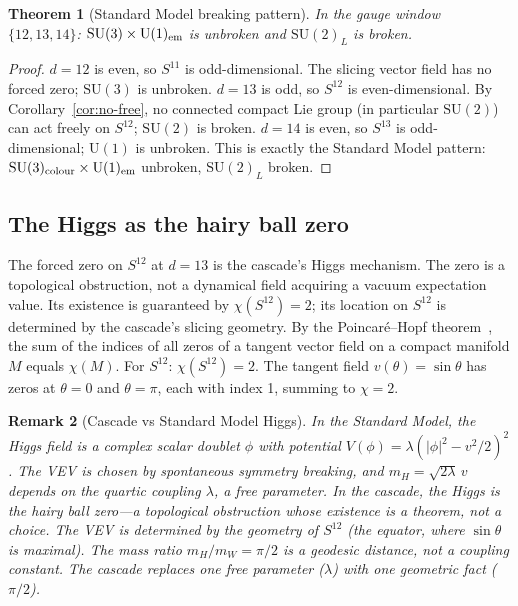 \documentclass[12pt,a4paper]{article}
\newtheorem{theorem}{Theorem}[section]
\newtheorem{remark}[theorem]{Remark}
\begin{document}
\begin{theorem}[Standard Model breaking pattern]\label{thm:breaking}
In the gauge window $\{12,13,14\}$: $\mathrm{SU}(3)\times\mathrm{U}(1)_{\rm em}$ is
unbroken and $\mathrm{SU}(2)_L$ is broken.
\end{theorem}
\begin{proof}
$d=12$ is even, so $S^{11}$ is odd-dimensional. The slicing vector field has no forced
zero; $\mathrm{SU}(3)$ is unbroken. $d=13$ is odd, so $S^{12}$ is even-dimensional.
By Corollary~\ref{cor:no-free}, no connected compact Lie group (in particular
$\mathrm{SU}(2)$) can act freely on $S^{12}$; $\mathrm{SU}(2)$ is broken. $d=14$ is
even, so $S^{13}$ is odd-dimensional; $\mathrm{U}(1)$ is unbroken. This is exactly the
Standard Model pattern: $\mathrm{SU}(3)_{\rm colour}\times\mathrm{U}(1)_{\rm em}$
unbroken, $\mathrm{SU}(2)_L$ broken.
\end{proof}

\subsection{The Higgs as the hairy ball zero}

The forced zero on $S^{12}$ at $d=13$ is the cascade's Higgs mechanism. The zero is a
topological obstruction, not a dynamical field acquiring a vacuum expectation value. Its
existence is guaranteed by $\chi(S^{12})=2$; its location on $S^{12}$ is determined by the
cascade's slicing geometry. By the Poincar\'{e}--Hopf theorem~\cite{hopf}, the sum of the
indices of all zeros of a tangent vector field on a compact manifold $M$ equals $\chi(M)$.
For $S^{12}$: $\chi(S^{12})=2$. The tangent field $v(\theta)=\sin\theta$ has zeros at
$\theta=0$ and $\theta=\pi$, each with index 1, summing to $\chi=2$.

\begin{remark}[Cascade vs Standard Model Higgs]
In the Standard Model, the Higgs field is a complex scalar doublet $\phi$ with potential
$V(\phi)=\lambda(|\phi|^2-v^2/2)^2$. The VEV is chosen by spontaneous symmetry breaking,
and $m_H=\sqrt{2\lambda}\,v$ depends on the quartic coupling $\lambda$, a free parameter.
In the cascade, the Higgs is the hairy ball zero---a topological obstruction whose existence
is a theorem, not a choice. The VEV is determined by the geometry of $S^{12}$ (the equator,
where $\sin\theta$ is maximal). The mass ratio $m_H/m_W=\pi/2$ is a geodesic distance, not
a coupling constant. The cascade replaces one free parameter ($\lambda$) with one geometric
fact ($\pi/2$).
\end{remark}
\end{document}
